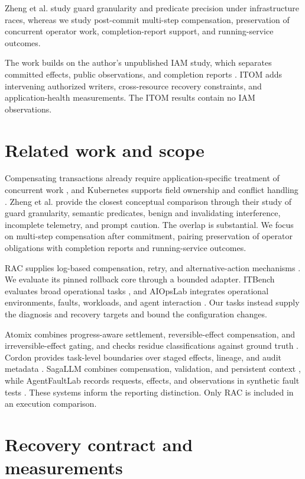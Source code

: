 \documentclass[conference,10pt]{IEEEtran}
\begin{document}
Zheng et al. \cite{ref5} study guard granularity and predicate precision under infrastructure races, whereas we study post-commit multi-step compensation, preservation of concurrent operator work, completion-report support, and running-service outcomes.

The work builds on the author's unpublished IAM study, which separates committed effects, public observations, and completion reports \cite{ref3}. ITOM adds intervening authorized writers, cross-resource recovery constraints, and application-health measurements. The ITOM results contain no IAM observations.

\section{Related work and scope}

Compensating transactions already require application-specific treatment of concurrent work \cite{ref1}, and Kubernetes supports field ownership and conflict handling \cite{ref2}. Zheng et al. \cite{ref5} provide the closest conceptual comparison through their study of guard granularity, semantic predicates, benign and invalidating interference, incomplete telemetry, and prompt caution. The overlap is substantial. We focus on multi-step compensation after commitment, pairing preservation of operator obligations with completion reports and running-service outcomes.

RAC supplies log-based compensation, retry, and alternative-action mechanisms \cite{ref4}. We evaluate its pinned rollback core through a bounded adapter. ITBench evaluates broad operational tasks \cite{ref6}, and AIOpsLab integrates operational environments, faults, workloads, and agent interaction \cite{ref7}. Our tasks instead supply the diagnosis and recovery targets and bound the configuration changes.

Atomix combines progress-aware settlement, reversible-effect compensation, and irreversible-effect gating, and checks residue classifications against ground truth \cite{ref8}. Cordon provides task-level boundaries over staged effects, lineage, and audit metadata \cite{ref9}. SagaLLM combines compensation, validation, and persistent context \cite{ref10}, while AgentFaultLab records requests, effects, and observations in synthetic fault tests \cite{ref11}. These systems inform the reporting distinction. Only RAC is included in an execution comparison.

\section{Recovery contract and measurements}
\end{document}
